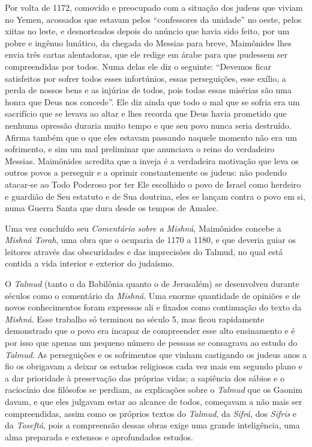 Por volta de 1172, comovido e preocupado com a situação dos judeus que
viviam no Yemen, acossados que estavam pelos ``confessores da unidade''
no oeste, pelos xiitas no leste, e desnorteados depois do anúncio que
havia sido feito, por um pobre e ingênuo lunático, da chegada do Messias
para breve, Maimônides lhes envia três cartas alentadoras, que ele
redige em árabe para que pudessem ser compreendidas por todos. Numa
delas ele diz o seguinte: ``Devemos ficar satisfeitos por sofrer todos
esses infortúnios, essas perseguições, esse exílio, a perda de nossos
bens e as injúrias de todos, pois todas essas misérias são uma honra que
Deus nos concede''. Ele diz ainda que todo o mal que se sofria era um
sacrifício que se levava ao altar e lhes recorda que Deus havia
prometido que nenhuma opressão duraria muito tempo e que seu povo nunca
seria destruído. Afirma também que o que eles estavam passando naquele
momento não era um sofrimento, e sim um mal preliminar que anunciava o
reino do verdadeiro Messias. Maimônides acredita que a inveja é a
verdadeira motivação que leva os outros povos a perseguir e a oprimir
constantemente os judeus: não podendo atacar-se ao Todo Poderoso por
ter Ele escolhido o povo de Israel como herdeiro e guardião de Seu
estatuto e de Sua doutrina, eles se lançam contra o povo em si, numa
Guerra Santa que dura desde os tempos de Amalec.

Uma vez concluído seu \emph{Comentário sobre a Mishná}, Maimônides
concebe a \emph{Mishná Torah}, uma obra que o ocuparia de 1170 a 1180, e
que deveria guiar os leitores através das obscuridades e das
imprecisões do Talmud, no qual está contida a vida interior e exterior
do judaísmo.

O \emph{Talmud} (tanto o da Babilônia quanto o de Jerusalém) se
desenvolveu durante séculos como o comentário da \emph{Mishná}. Uma
enorme quantidade de opiniões e de novos conhecimentos foram expressos
ali e fixados como continuação do texto da \emph{Mishná}. Esse trabalho
só terminou no século 5, mas ficou rapidamente demonstrado que o povo
era incapaz de compreender esse alto ensinamento e é por isso que apenas
um pequeno número de pessoas se consagrava ao estudo do \emph{Talmud}.
As perseguições e os sofrimentos que vinham castigando os judeus anos a
fio os obrigavam a deixar os estudos religiosos cada vez mais em segundo
plano e a dar prioridade à preservação das próprias vidas; a sapiência
dos sábios e o raciocínio dos filósofos se perdiam, as explicações sobre
o \emph{Talmud} que os Gaonim davam, e que eles julgavam estar ao
alcance de todos, começavam a não mais ser compreendidas, assim como os
próprios textos do \emph{Talmud}, da \emph{Sifrá}, dos \emph{Sifris} e
da \emph{Toseftá}, pois a compreensão dessas obras exige uma grande
inteligência, uma alma preparada e extensos e aprofundados estudos.

